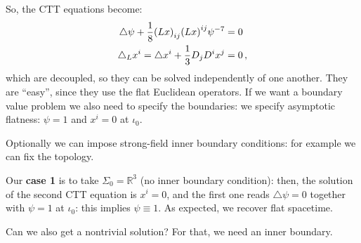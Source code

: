 \documentclass[main.tex]{subfiles}
\begin{document}
So, the CTT equations become: 
%
\begin{align}
\triangle \psi + \frac{1}{8} \qty(Lx )_{ij} \qty(Lx)^{ij} \psi^{-7} &= 0  \\
\triangle_L x^{i} = \triangle x^{i} + \frac{1}{3} D_j D^{i} x^{j} &= 0
\,,
\end{align}
%
which are decoupled, so they can be solved independently of one another. 
They are ``easy'', since they use the flat Euclidean operators. 
If we want a boundary value problem we also need to specify the boundaries: we specify asymptotic flatness: \(\psi = 1\) and \(x^{i} = 0\) at \(\iota_0\). 

Optionally we can impose strong-field inner boundary conditions: for example we can fix the topology. 

Our \textbf{case 1} is to take \(\Sigma_0 = \mathbb{R}^{3}\) (no inner boundary condition): then, the solution of the second CTT equation is \(x^{i}= 0\), and the first one reads \(\triangle \psi = 0\) together with \(\psi = 1\) at \(\iota_0 \): this implies \(\psi \equiv 1\).
As expected, we recover flat spacetime. 

Can we also get a nontrivial solution? 
For that, we need an inner boundary. 
\end{document}
